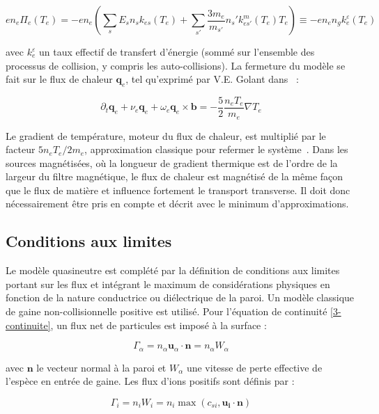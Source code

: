 \begin{refsection}
\begin{equation}
en_e\Pi_e(T_e)
=-en_e\left(\sum_{s}E_sn_sk_{es}(T_e)+\sum_{s'}\frac{3m_e}{m_{s'}}n_s'k^m_{es'}(T_e)T_e\right)
\equiv-en_en_gk^\varepsilon_e(T_e)
\end{equation}


avec $k_e^\varepsilon$ un taux effectif de transfert d'énergie (sommé sur 
l'ensemble des processus de collision, y compris les auto-collisions).
La fermeture du modèle se fait sur le flux de chaleur $\mathbf{q}_e$, tel qu'exprimé par V.E. Golant
dans~\parencite{Golant} :

\begin{equation}
\label{3-eqFluxChaleur}
\partial_t \mathbf{q}_e + \nu_e\mathbf{q}_e+\omega_e\mathbf{q}_e\times\mathbf{b} =
-\frac{5}{2}\frac{n_eT_e}{m_e}\nabla T_e
\end{equation}

Le gradient de température, moteur du flux de chaleur, est multiplié par le
facteur $5n_eT_e/2m_e$, approximation classique pour refermer le
système~\parencite{bittencourt}.
Dans les sources magnétisées,
où la longueur de gradient thermique est de l'ordre de la largeur
du filtre magnétique, le flux de chaleur est magnétisé de la même façon que le
flux de matière et influence fortement le transport transverse. Il doit donc
nécessairement être pris en compte et décrit avec le minimum d'approximations.

\subsection{Conditions aux limites}
Le modèle quasineutre est complété par la
définition de conditions aux limites portant sur les flux et intégrant le
maximum de considérations physiques en fonction de la nature conductrice ou
diélectrique de la paroi.
Un modèle classique de gaine non-collisionnelle positive est utilisé. Pour
l'équation de continuité \eqref{3-continuite}, un flux net de
particules est imposé à la surface :

\begin{equation}
	\Gamma_\alpha=n_\alpha\mathbf u_\alpha\cdot \mathbf n=n_\alpha W_\alpha
\end{equation} 

avec $\mathbf{n}$ le vecteur normal à la paroi et $W_\alpha$ une vitesse de
perte effective de l'espèce en entrée de gaine. Les flux d'ions positifs sont
définis par :

\begin{equation}
\label{3-fluxIonique}
\Gamma_i=n_iW_i=n_i\max\left(c_{si},\mathbf{u_i}\cdot\mathbf{n}\right)
\end{equation}


\end{refsection}

